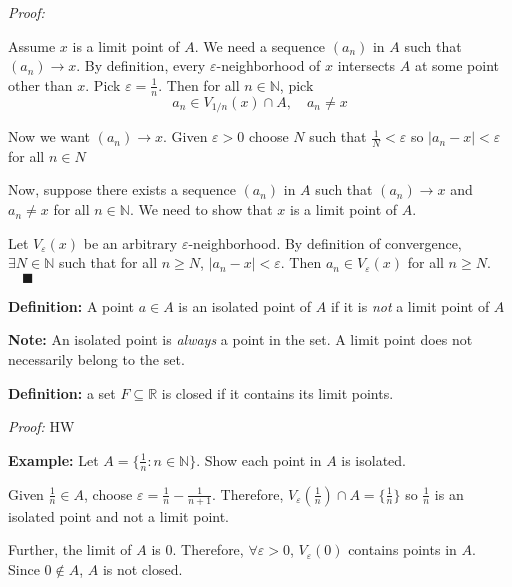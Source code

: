 \documentclass[12pt]{report}
\newcommand{\R}{\mathbb{R}}
\newcommand{\N}{\mathbb{N}}
\newcommand{\qed}{\quad \blacksquare}
\newcommand{\abs}[1]{\left\vert #1 \right\vert}
\newcommand{\ep}{\varepsilon}
\newenvironment*{tbox}[2][gray]{
    \begin{tcolorbox}[
        parbox=false,
        colback=#1!5!white,
        colframe=#1!75!black,
        breakable,
        title={#2}
    ]}
    {\end{tcolorbox}}
\begin{document}
    \begin{tbox}{\textbf{Theorem:} A point $x$ is a limit point of a set $A$ iff there exists a sequence $(a_n)$ in $A$ such that $(a_n) \to x$ and $a_n \neq x$ for all $n \in \N$}
        \emph{Proof:} 
        
        Assume $x$ is a limit point of $A$. We need a sequence $(a_n)$ in $A$ such that $(a_n) \to x$. By definition, every $\ep$-neighborhood of $x$ intersects $A$ at some point other than $x$. Pick $\ep = \frac{1}{n}$. Then for all $n \in \N$, pick 
        \[a_n \in V_{1/n}(x) \cap A, \quad a_n \neq x\]

        Now we want $(a_n) \to x$. Given $\ep > 0$ choose $N$ such that $\frac{1}{N} < \ep$ so $\abs{a_n  - x} < \ep$ for all $n \in N$

        Now, suppose there exists a sequence $(a_n)$ in $A$ such that $(a_n) \to x$ and $a_n \neq x$ for all $n \in \N$. We need to show that $x$ is a limit point of $A$.

        Let $V_{\ep}(x)$ be an arbitrary $\ep$-neighborhood. By definition of convergence, $\exists N \in \N$ such that for all $n \geq N$, $\abs{a_n - x} < \ep$. Then $a_n \in V_{\ep}(x)$ for all $n \geq N$. $\qed$
    \end{tbox}

    \textbf{Definition:} A point $a \in A$ is an isolated point of $A$ if it is \emph{not} a limit point of $A$ 

    \textbf{Note:} An isolated point is \emph{always} a point in the set. A limit point does not necessarily belong to the set. 

    \textbf{Definition:} a set $F \subseteq \R$ is closed if it contains its limit points.

    \begin{tbox}{\textbf{Theorem:} A set $F \subseteq \R$ is closed iff every Cauchy sequence contained in $F$ has a limit in $F$}
        \emph{Proof:} HW
    \end{tbox}

    \textbf{Example:} Let $A = \{\frac{1}{n}: n \in \N\}$. Show each point in $A$ is isolated. 
    
    Given $\frac{1}{n} \in A$, choose $\ep = \frac{1}{n} - \frac{1}{n+1}$. Therefore, $V_{\ep}(\frac{1}{n}) \cap A = \{\frac{1}{n}\}$ so $\frac{1}{n}$ is an isolated point and not a limit point. 

    Further, the limit of $A$ is $0$. Therefore, $\forall \ep > 0$, $V_{\ep}(0)$ contains points in $A$. Since $0 \notin A$, $A$ is not closed. 
\end{document}
